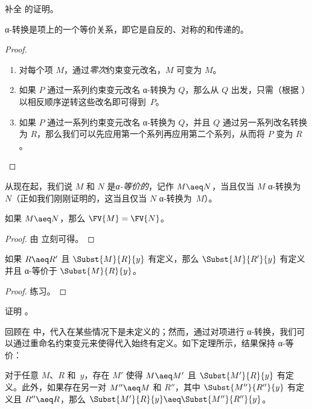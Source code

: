 \documentclass[../../../include/open-logic-section]{subfiles}
\begin{document}
\begin{prob}
  补全  的证明。
\end{prob}

\begin{thm}
  α-转换是项上的一个等价关系，即它是自反的、对称的和传递的。
\end{thm}

\begin{proof}
  \begin{enumerate}
  \item 对每个项 $M$，通过\emph{零次}约束变元改名，$M$ 可变为 $M$。
  \item 如果 $P$ 通过一系列约束变元改名 α-转换为 $Q$，那么从 $Q$ 出发，只需（根据 ）以相反顺序逆转这些改名即可得到~$P$。
  \item 如果 $P$ 通过一系列约束变元改名 α-转换为 $Q$，并且 $Q$ 通过另一系列改名转换为 $R$，那么我们可以先应用第一个系列再应用第二个系列，从而将 $P$ 变为 $R$。
  \end{enumerate}
\end{proof}

从现在起，我们说 $M$ 和 $N$ 是\emph{α-等价的}，记作 $M \aeq N$，当且仅当 $M$ α-转换为 $N$（正如我们刚刚证明的，这当且仅当 $N$ α-转换为~$M$）。

\begin{thm}
  如果 $M \aeq N$，那么 $\FV{M} = \FV{N}$。
\end{thm}

\begin{proof}
  由  立刻可得。
\end{proof}

\begin{lem}
  如果 $R \aeq R'$ 且 $\Subst{M}{R}{y}$ 有定义，那么 $\Subst{M}{R'}{y}$ 有定义并且 α-等价于 $\Subst{M}{R}{y}$。
\end{lem}

\begin{proof}
  练习。
\end{proof}

\begin{prob}
  证明 。
\end{prob}

回顾在  中，代入在某些情况下是未定义的；然而，通过对项进行 α-转换，我们可以通过重命名约束变元来使得代入始终有定义。如下定理所示，结果保持 α-等价：

\begin{thm}
  对于任意 $M$、$R$ 和~$y$，存在 $M'$ 使得 $M \aeq M'$ 且 $\Subst{M'}{R}{y}$ 有定义。此外，如果存在另一对 $M'' \aeq M$ 和 $R''$，其中 $\Subst{M''}{R''}{y}$ 有定义且 $R'' \aeq R$，那么 $\Subst{M'}{R}{y} \aeq \Subst{M''}{R''}{y}$。
\end{thm}
\end{document}

